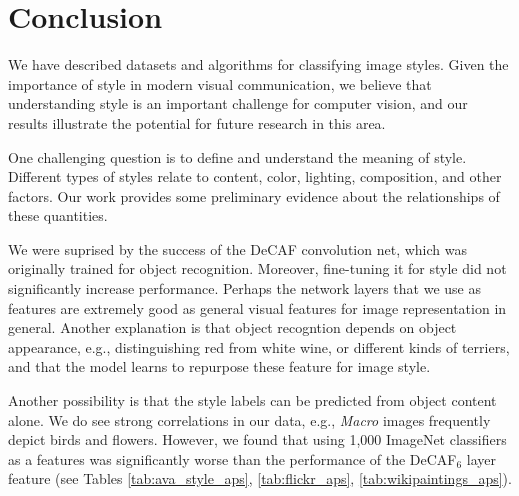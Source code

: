 
\section{Conclusion}

We have described datasets and algorithms for classifying image styles.  Given the importance of style in modern visual communication, we believe that understanding style is an important challenge for computer vision, and our results illustrate the potential for future research in this area.

One challenging question is to define and understand the meaning of style.  Different types of styles relate to content, color, lighting, composition, and other factors.  Our work provides some preliminary evidence about the relationships of these quantities.  %

We were suprised by the success of the DeCAF convolution net, which was originally trained for object recognition. Moreover, fine-tuning it for style did not significantly increase performance.
Perhaps the network layers that we use as features are extremely good as general visual features for image representation in general. Another explanation is that object recogntion depends on object appearance, e.g., distinguishing red from white wine, or different kinds of terriers, and that the model learns to repurpose these feature for image style.

Another possibility is that the style labels can be predicted from object content alone.  We do see strong correlations in our data, e.g., \emph{Macro} images frequently depict birds and flowers.%
However, we found that using 1,000 ImageNet classifiers as a features
was significantly worse than
the performance of the DeCAF$_6$ layer feature
(see Tables \ref{tab:ava_style_aps}, \ref{tab:flickr_aps}, \ref{tab:wikipaintings_aps}).


